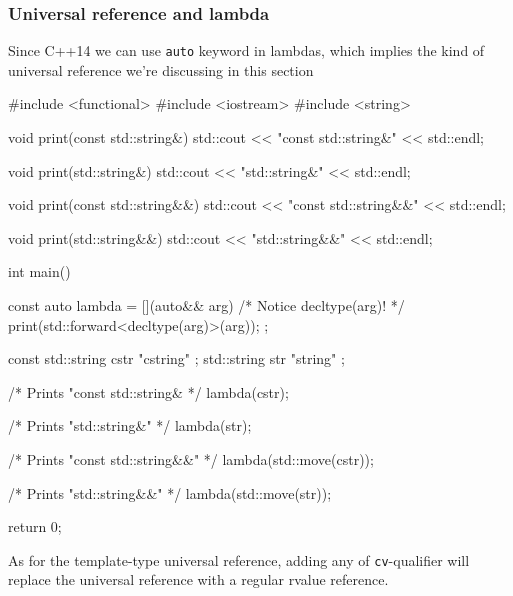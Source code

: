 \documentclass[../main]{subfiles}
\begin{document}
\subsubsection{Universal reference and lambda}
    Since C++14 we can use \texttt{auto} keyword in lambdas, which implies the kind of universal reference we're discussing in this section
\begin{Code}
    #include <functional>
    #include <iostream>
    #include <string>
    
    void print(const std::string&)
    {
        std::cout << "const std::string&" << std::endl;
    }
    
    void print(std::string&)
    {
        std::cout << "std::string&" << std::endl;
    }
    
    void print(const std::string&&)
    {
        std::cout << "const std::string&&" << std::endl;
    }
    
    void print(std::string&&)
    {
        std::cout << "std::string&&" << std::endl;
    }
    
    int main()
    {
        const auto lambda = [](auto&& arg)
        {
            /* Notice decltype(arg)! */
            print(std::forward<decltype(arg)>(arg));
        };
        
        const std::string cstr { "cstring" };
        std::string str { "string" };

        /* Prints "const std::string& */
        lambda(cstr);

        /* Prints "std::string&" */
        lambda(str);

        /* Prints "const std::string&&" */
        lambda(std::move(cstr));

        /* Prints "std::string&&" */
        lambda(std::move(str));
        
        return 0;
    }
\end{Code}
\noindent
As for the template-type universal reference, adding any of \texttt{cv}-qualifier will replace the universal reference with a regular rvalue reference.
\end{document}
